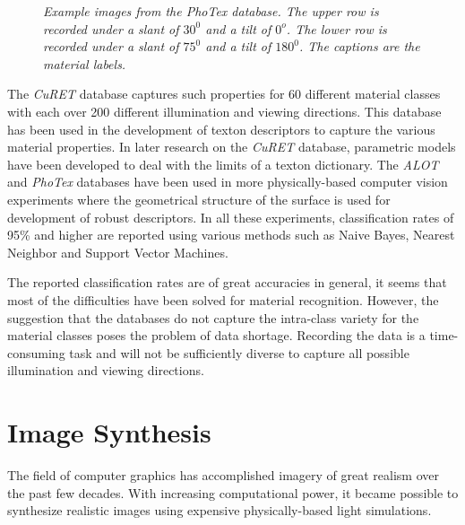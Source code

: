 \begin{figure}[htbp!]
	\begin{center}
		\label{fig:aab1}
		\label{fig:acd1}
		\label{fig:adh1}

		\label{fig:aab2}
		\label{fig:acd2}
		\label{fig:adh2}
	\end{center}
	\caption{{\it Example images from the PhoTex database. The upper row is recorded under a slant of $30^0$ and a tilt of $0^o$. The lower row is recorded under a slant of $75^0$ and a tilt of $180^0$. The captions are the material labels.}}
	\label{fig:PhoTexExamples}
\end{figure}

The {\it CuRET} database captures such properties for 60 different material classes with each over 200 different illumination and viewing directions. This database has been used in the development of texton descriptors to capture the various material properties. In later research on the {\it CuRET} database, parametric models have been developed to deal with the limits of a texton dictionary. The {\it ALOT} and {\it PhoTex} databases have been used in more physically-based computer vision experiments where the geometrical structure of the surface is used for development of robust descriptors. In all these experiments, classification rates of 95\% and higher are reported using various methods such as Naive Bayes, Nearest Neighbor and Support Vector Machines.

The reported classification rates are of great accuracies in general, it seems that most of the difficulties have been solved for material recognition. However, the suggestion that the databases do not capture the intra-class variety for the material classes poses the problem of data shortage. Recording the data is a time-consuming task and will not be sufficiently diverse to capture all possible illumination and viewing directions. 

\section{Image Synthesis}
The field of computer graphics has accomplished imagery of great realism over the past few decades. With increasing computational power, it became possible to synthesize realistic images using expensive physically-based light simulations. 

